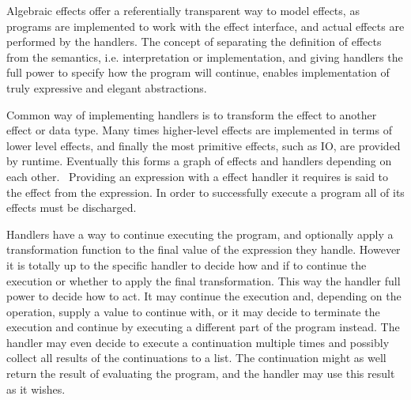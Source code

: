 Algebraic effects offer a referentially transparent way to model effects, as programs are implemented to work with the effect interface, and actual effects are performed by the handlers. The concept of separating the definition of effects from the semantics, i.e. interpretation or implementation, and giving handlers the full power to specify how the program will continue, enables implementation of truly expressive and elegant abstractions.

Common way of implementing handlers is to transform the effect to another effect or data type. Many times higher-level effects are implemented in terms of lower level effects, and finally the most primitive effects, such as IO, are provided by runtime. Eventually this forms a graph of effects and handlers depending on each other.~\cite{intro-to-alg-eff} Providing an expression with a effect handler it requires is said to  the effect from the expression. In order to successfully execute a program all of its effects must be discharged.

Handlers have a way to continue executing the program, and optionally apply a transformation function to the final value of the expression they handle. However it is totally up to the specific handler to decide how and if to continue the execution or whether to apply the final transformation. This way the handler full power to decide how to act. It may continue the execution and, depending on the operation, supply a value to continue with, or it may decide to terminate the execution and continue by executing a different part of the program instead. The handler may even decide to execute a continuation multiple times and possibly collect all results of the continuations to a list. The continuation might as well return the result of evaluating the program, and the handler may use this result as it wishes.




